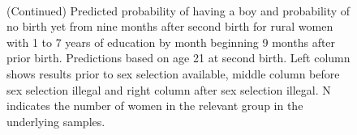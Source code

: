 \documentclass[12pt,letterpaper]{article}
\begin{document}
\begin{figure}[htpb]
{\begin{minipage}{0.31\textwidth}
        \captionsetup[subfigure]{labelformat=empty,position=top,captionskip=-1pt,farskip=-0.5pt}
        \\
        \captionsetup[subfigure]{labelformat=parens}
    \end{minipage}
}
\setcounter{subfigure}{6}
\caption{(Continued) Predicted probability of having a boy and probability of
no birth yet from nine months after second birth for rural
women with 1 to 7 years of education by month beginning 9 months after prior birth. 
Predictions based on age 21 at second birth.
Left column shows results prior to sex selection available, middle column before
sex selection illegal and right column after sex selection illegal.
N indicates the number of women in the relevant group in the underlying samples.
}
\end{figure}


\end{document}
